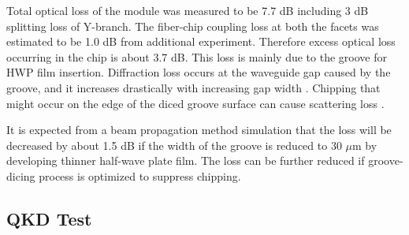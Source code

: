 \documentclass[letterpaper, 10pt]{article}
\begin{document}
Total optical  loss of the module was measured to be 7.7 dB including 3 dB splitting loss of Y-branch.
The fiber-chip coupling loss at both the facets was estimated to be 1.0 dB from additional experiment.
Therefore excess optical loss occurring in the chip is about 3.7 dB.
This loss is mainly due to the groove for HWP film insertion.
Diffraction loss occurs at the waveguide gap caused by the groove, and it increases drastically with increasing gap width \cite{Inoue:1997es}.
Chipping that might occur on the edge of the diced groove surface can cause scattering loss \cite{Carpenter:2013fh}.

It is expected from a beam propagation method simulation that the loss will be decreased by about 1.5 dB if the width of the groove is reduced to 30 $\mu$m by developing thinner half-wave plate film.
The loss can be further reduced if groove-dicing process is optimized to suppress chipping.

\subsection{QKD Test}
\end{document}
